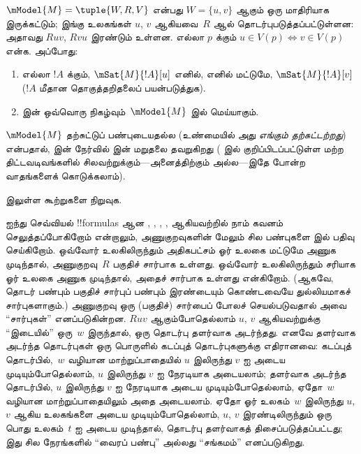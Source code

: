 \documentclass[../../../include/open-logic-section]{subfiles}
\begin{document}
\begin{prop}
  $\mModel{M} = \tuple{W, R, V}$ என்பது $W = \{u, v\}$ ஆகும் ஒரு மாதிரியாக
  இருக்கட்டும்; இங்கு உலகங்கள் $u$, $v$ ஆகியவை~$R$ ஆல் தொடர்புபடுத்தப்பட்டுள்ளன:
  அதாவது $Ruv$, $Rvu$ இரண்டும் உள்ளன. எல்லா $p$ க்கும் $u \in V(p)
  \Leftrightarrow v \in V(p)$ என்க. அப்போது:
  \begin{enumerate}
  \item எல்லா $!A$ க்கும், $\mSat{M}{!A}[u]$ எனில், எனில் மட்டுமே,
    $\mSat{M}{!A}[v]$ ($!A$ மீதான தொகுத்தறிதலைப் பயன்படுத்துக).
  \item {} இன் ஒவ்வொரு நிகழ்வும்~$\mModel{M}$ இல் மெய்யாகும்.
  \end{enumerate}
  $\mModel{M}$ தற்சுட்டுப் பண்புடையதல்ல (உண்மையில் அது
  \emph{எங்கும் தற்சுட்டற்றது}) என்பதால்,  இன் நேர்வில்
   இன் மறுதலை தவறுகிறது (
  இல் குறிப்பிடப்பட்டுள்ள மற்ற திட்டவடிவங்களில் சிலவற்றுக்கும்---அனைத்திற்கும்
  அல்ல---இதே போன்ற வாதங்களைக் கொடுக்கலாம்).
\end{prop}

\begin{prob}
   இலுள்ள கூற்றுகளை நிறுவுக.
\end{prob}

ஐந்து செவ்வியல் !!{formula}s ஆன , , , ,
 ஆகியவற்றில் நாம் கவனம் செலுத்தப்போகிறோம் என்றாலும், அணுகுறவுகளின்
மேலும் சில பண்புகளை  இல் பதிவு செய்கிறோம்.
ஒவ்வோர் உலகிலிருந்தும் அதிகபட்சம் ஓர் உலகை மட்டுமே அணுக முடிந்தால்,
அணுகுறவு~$R$ பகுதிச் சார்பாக உள்ளது. ஒவ்வோர் உலகிலிருந்தும் சரியாக
ஓர் உலகை அணுக முடிந்தால், அதைச் சார்பாக உள்ளது என்கிறோம். (ஆகவே,
தொடர் பண்பும் பகுதிச் சார்புப் பண்பும் இரண்டையும் கொண்டவையே துல்லியமாகச்
சார்புகளாகும்.) அணுகுறவு ஒரு (பகுதிச்) சார்பைப் போலச் செயல்படுவதால் அவை
``சார்புகள்'' எனப்படுகின்றன. $Ruv$ ஆகும்போதெல்லாம் $u$, $v$ ஆகியவற்றுக்கு
``இடையில்'' ஒரு~$w$ இருந்தால், ஒரு தொடர்பு தளர்வாக அடர்ந்தது.
எனவே தளர்வாக அடர்ந்த தொடர்புகள் ஒரு பொருளில் கடப்புத் தொடர்புகளுக்கு
எதிரானவை: கடப்புத் தொடர்பில்,~$w$ வழியான மாற்றுப்பாதையில் $u$ இலிருந்து
$v$ ஐ அடைய முடியும்போதெல்லாம், $u$ இலிருந்து $v$ ஐ நேரடியாக அடையலாம்;
தளர்வாக அடர்ந்த தொடர்பில், $u$ இலிருந்து $v$ ஐ நேரடியாக அடைய
முடியும்போதெல்லாம், ஏதோ~$w$ வழியான மாற்றுப்பாதையிலும் அதை அடையலாம்.
ஏதோ ஓர் உலகம்~$w$ இலிருந்து $u$, $v$ ஆகிய உலகங்களை அடைய
முடியும்போதெல்லாம், $u$, $v$ இரண்டிலிருந்தும் ஒரு பொது உலகம்~$t$ ஐ அடைய
முடிந்தால், தொடர்பு தளர்வாகத் திசைப்படுத்தப்பட்டது; இது சில நேரங்களில்
``வைரப் பண்பு'' அல்லது ``சங்கமம்'' எனப்படுகிறது.
\end{document}
